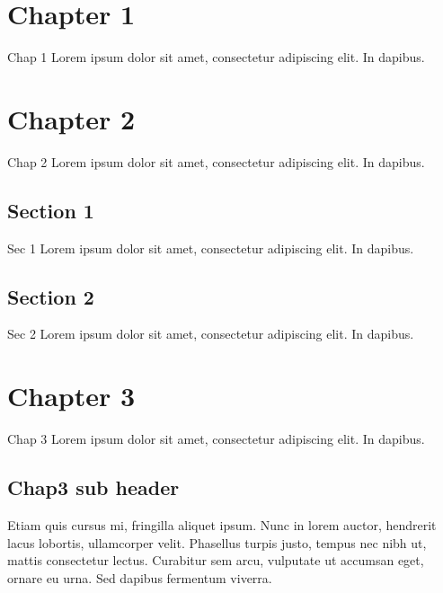 \chapter{Chapter 1}
\label{\detokenize{part1/chap1:chapter-1}}\label{\detokenize{part1/chap1::doc}}
\sphinxAtStartPar
Chap 1 Lorem ipsum dolor sit amet, consectetur adipiscing elit. In dapibus.


\chapter{Chapter 2}
\label{\detokenize{part1/chap2:chapter-2}}\label{\detokenize{part1/chap2::doc}}
\sphinxAtStartPar
Chap 2 Lorem ipsum dolor sit amet, consectetur adipiscing elit. In dapibus.

\sphinxAtStartPar


\sphinxAtStartPar
{}


\section{Section 1}
\label{\detokenize{part1/sec1:section-1}}\label{\detokenize{part1/sec1::doc}}
\sphinxAtStartPar
Sec 1 Lorem ipsum dolor sit amet, consectetur adipiscing elit. In dapibus.


\section{Section 2}
\label{\detokenize{part1/sec2:section-2}}\label{\detokenize{part1/sec2::doc}}
\sphinxAtStartPar
Sec 2 Lorem ipsum dolor sit amet, consectetur adipiscing elit. In dapibus.


\chapter{Chapter 3}
\label{\detokenize{part2/chap3:chapter-3}}\label{\detokenize{part2/chap3::doc}}
\sphinxAtStartPar
Chap 3 Lorem ipsum dolor sit amet, consectetur adipiscing elit. In dapibus.


\section{Chap3 sub header}
\label{\detokenize{part2/chap3:chap3-sub-header}}
\sphinxAtStartPar
Etiam quis cursus mi, fringilla aliquet ipsum. Nunc in lorem auctor, hendrerit lacus lobortis, ullamcorper velit. Phasellus turpis justo, tempus nec nibh ut, mattis consectetur lectus. Curabitur sem arcu, vulputate ut accumsan eget, ornare eu urna. Sed dapibus fermentum viverra.


